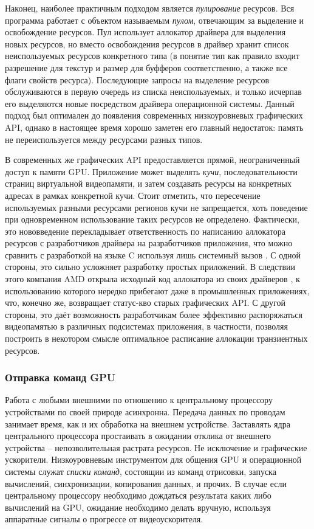 Наконец, наиболее практичным подходом является \textit{пулирование} ресурсов.
Вся программа работает с объектом называемым \textit{пулом}, отвечающим за выделение и освобождение ресурсов.
Пул использует аллокатор драйвера для выделения новых ресурсов, но вместо освобождения ресурсов в драйвер хранит список неиспользуемых ресурсов конкретного типа (в понятие тип как правило входит разрешение для текстур и размер для буфферов соответственно, а также все флаги свойств ресурса).
Последующие запросы на выделение ресурсов обслуживаются в первую очередь из списка неиспользуемых, и только исчерпав его выделяются новые посредством драйвера операционной системы.
Данный подход был оптимален до появления современных низкоуровневых графических API, однако в настоящее время хорошо заметен его главный недостаток: память не переиспользуется между ресурсами разных типов.

В современных же графических API предоставляется прямой, неограниченный доступ к памяти GPU.
Приложение может выделять \textit{кучи}, последовательности страниц виртуальной видеопамяти, и затем создавать ресурсы на конкретных адресах в рамках конкретной кучи.
Стоит отметить, что пересечение используемых разными ресурсами регионов кучи не запрещается, хоть поведение при одновременном использование таких ресурсов не определено.
Фактически, это нововведение перекладывает ответственность по написанию аллокатора ресурсов с разработчиков драйвера на разработчиков приложения, что можно сравнить с разработкой на языке C используя лишь системный вызов .
С одной стороны, это сильно усложняет разработку простых приложений.
В следствии этого компания AMD открыла исходный код аллокатора из своих драйверов , к использованию которого нередко прибегают даже в промышленных приложениях, что, конечно же, возвращает статус-кво старых графических API.
С другой стороны, это даёт возможность разработчикам более эффективно распоряжаться видеопамятью в различных подсистемах приложения, в частности, позволяя построить в некотором смысле оптимальное расписание аллокации транзиентных ресурсов.

\subsubsection*{Отправка команд GPU}
Работа с любыми внешними по отношению к центральному процессору устройствами по своей природе асинхронна.
Передача данных по проводам занимает время, как и их обработка на внешнем устройстве.
Заставлять ядра центрального процессора простаивать в ожидании отклика от внешнего устройства -- непозволительная растрата ресурсов.
Не исключение и графические ускорители.
Низкоуровневым инструментом для общения GPU и операционной системы служат \textit{списки команд}, состоящии из команд отрисовки, запуска вычислений, синхронизации, копирования данных, и прочих.
В случае если центральному процессору необходимо дождаться результата каких либо вычислений на GPU, ожидание необходимо делать вручную, используя аппаратные сигналы о прогрессе от видеоускорителя.

